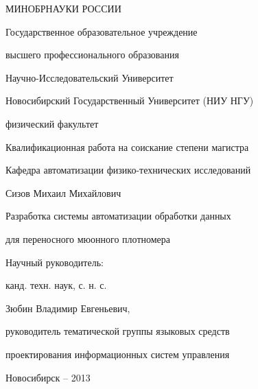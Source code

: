 \thispagestyle{empty}
\begin{large}


\begin{center}
МИНОБРНАУКИ РОССИИ\par
Государственное образовательное учреждение \par
высшего профессионального образования\par 
\end{center}



\begin{center}
Научно-Исследовательский Университет 

Новосибирский Государственный Университет (НИУ НГУ)\par
\end{center}



\begin{center}
физический факультет
\end{center}

\vspace{10mm}
\begin{center}
Квалификационная работа на соискание степени магистра

Кафедра автоматизации физико-технических исследований
\end{center}

\vspace{15mm}
\begin{center}
Сизов Михаил Михайлович


Разработка системы автоматизации обработки данных 


для переносного мюонного плотномера
\end{center}

\vspace{20mm}
%

\begin{flushleft}

Научный руководитель:

канд. техн. наук, с. н. с.

Зюбин Владимир Евгеньевич,

руководитель тематической группы языковых средств 

проектирования информационных систем управления

\end{flushleft}
\end{large}
\vspace{20mm}
\begin{center}
{Новосибирск -- 2013}
\end{center}

\newpage